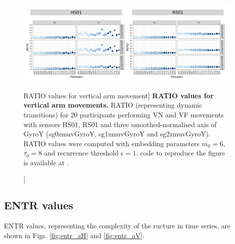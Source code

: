 \begin{figure}
\centering
\includegraphics[width=1.0\textwidth]{ratio_aV}
    \caption
	[RATIO values for vertical arm movement]{
	{\bf RATIO values for vertical arm movements.}
	RATIO (representing dynamic transitions) for 
	20 participants performing VN and VF movements
	with sensors HS01, RS01 and three smoothed-normalised axis 
	of GyroY (sg0zmuvGyroY, sg1zmuvGyroY and sg2zmuvGyroY).
	RATIO values were computed with
	embedding parameters $\overline{m_0}=6$, $\overline{\tau_0}=8$ and
	recurrence threshold $\epsilon=1$.
	\R code to reproduce the figure is available at 
	.
        }
    \label{fig:ratio_aV}
\end{figure}



\newpage
\subsection{ENTR values}
ENTR values, representing the complexity of the ructure in time series,
are shown in Figs. \ref{fig:entr_aH} and \ref{fig:entr_aV}.

